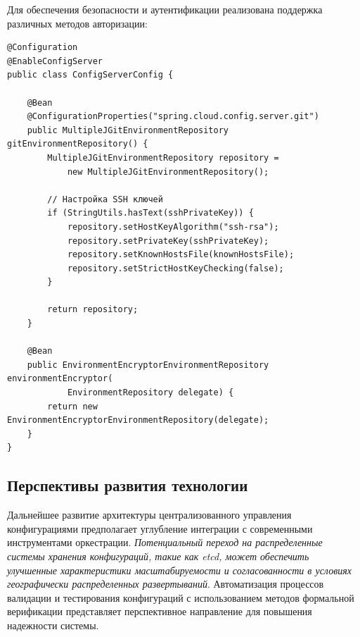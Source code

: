Для обеспечения безопасности и аутентификации реализована поддержка различных методов авторизации:

\begin{lstlisting}
@Configuration
@EnableConfigServer
public class ConfigServerConfig {

    @Bean
    @ConfigurationProperties("spring.cloud.config.server.git")
    public MultipleJGitEnvironmentRepository gitEnvironmentRepository() {
        MultipleJGitEnvironmentRepository repository =
            new MultipleJGitEnvironmentRepository();

        // Настройка SSH ключей
        if (StringUtils.hasText(sshPrivateKey)) {
            repository.setHostKeyAlgorithm("ssh-rsa");
            repository.setPrivateKey(sshPrivateKey);
            repository.setKnownHostsFile(knownHostsFile);
            repository.setStrictHostKeyChecking(false);
        }

        return repository;
    }

    @Bean
    public EnvironmentEncryptorEnvironmentRepository environmentEncryptor(
            EnvironmentRepository delegate) {
        return new EnvironmentEncryptorEnvironmentRepository(delegate);
    }
}
\end{lstlisting}

\subsection{Перспективы развития технологии}

Дальнейшее развитие архитектуры централизованного управления конфигурациями предполагает углубление интеграции с современными инструментами оркестрации. \textit{Потенциальный переход на распределенные системы хранения конфигураций, такие как etcd, может обеспечить улучшенные характеристики масштабируемости и согласованности в условиях географически распределенных развертываний}. Автоматизация процессов валидации и тестирования конфигураций с использованием методов формальной верификации представляет перспективное направление для повышения надежности системы.
